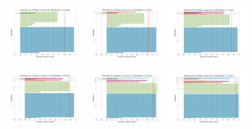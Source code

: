 \documentclass[10pt, a4paper]{article}
\begin{document}
    	\newpage
    	\begin{figure}[hbt!]
    		\centering
    		\includegraphics[width = 3.5cm]{silhouette_visualization_2.png}
    		\includegraphics[width = 3.5cm]{silhouette_visualization_3.png}
    		\includegraphics[width = 3.5cm]{silhouette_visualization_4.png}
    		
    		\includegraphics[width = 3.5cm]{silhouette_visualization_5.png}
    		\includegraphics[width = 3.5cm]{silhouette_visualization_6.png}
    		\includegraphics[width = 3.5cm]{silhouette_visualization_7.png}
    		

\end{figure}
\end{document}
